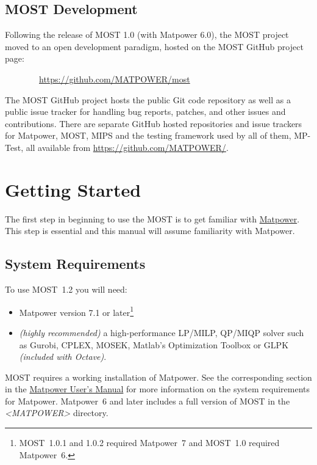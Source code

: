 \documentclass[12pt]{article}
\newcommand{\mpver}[0]{7.1}
\newcommand{\matlab}[0]{{\sc Matlab}}
\newcommand{\matpower}[0]{{\sc Matpower}}
\newcommand{\matpowerurl}[0]{https://matpower.org}
\newcommand{\matpowerlink}[0]{\href{\matpowerurl}{\matpower{}}}
\newcommand{\mptest}[0]{{MP-Test}}
\newcommand{\mips}[0]{{MIPS}}
\newcommand{\most}[0]{{MOST}}
\newcommand{\mosturl}[0]{https://github.com/MATPOWER/most}
\newcommand{\mostver}[0]{1.2}
\newcommand{\cplex}[0]{{CPLEX}}
\newcommand{\glpk}[0]{{GLPK}}
\newcommand{\gurobi}[0]{{Gurobi}}
\newcommand{\mosek}[0]{{MOSEK}}
\newcommand{\ot}[0]{{Optimization Toolbox}}
\newcommand{\code}[1]{{\relsize{-0.5}{\tt{{#1}}}}}  %
\newcommand{\mppath}[1]{\textsf{\textsl{{\relsize{-1.0}\textless{}\mbox{MATPOWER}\textgreater{}}}}\code{{#1}}}  %
\newcommand{\mostpath}[1]{\mppath{}\code{/most{#1}}}
\newcommand{\mumurl}[0]{https://matpower.org/docs/MATPOWER-manual-\mpver.pdf}
\newcommand{\mum}[0]{\href{\mumurl}{\matpower{} User's Manual}}
\numberwithin{equation}{section}
\numberwithin{table}{section}
\numberwithin{figure}{section}
\begin{document}
\subsection{\most{} Development}
\label{sec:development}

Following the release of \most{} 1.0 (with \matpower{} 6.0), the \most{} project moved to an open development paradigm, hosted on the \most{} GitHub project page:

\bigskip

~~~~~~~~\url{\mosturl}

\bigskip

The \most{} GitHub project hosts the public Git code repository as well as a public issue tracker for handling bug reports, patches, and other issues and contributions. There are separate GitHub hosted repositories and issue trackers for \matpower{}, \most{}, \mips{} and the testing framework used by all of them, \mptest{}, all available from \url{https://github.com/MATPOWER/}.


\clearpage
\section{Getting Started}

The first step in beginning to use the \most{} is to get familiar with \matpowerlink{}. This step is essential and this manual will assume familiarity with \matpower{}.

\subsection{System Requirements}
\label{sec:sysreq}
To use \most{}~\mostver{} you will need:
\begin{itemize}
\item \matpower{} version 7.1 or later\footnote{\most{}~1.0.1 and 1.0.2 required \matpower{}~7 and \most{}~1.0 required \matpower{}~6.}
\item \emph{(highly recommended)} a high-performance LP/MILP, QP/MIQP solver such as \gurobi{}, \cplex{}, \mosek{}, \matlab{}'s \ot{} or \glpk{} \emph{(included with Octave)}.
\end{itemize}

\most{} requires a working installation of \matpower{}. See the corresponding section in the \mum{} for more information on the system requirements for \matpower{}.
\matpower{}~6 and later includes a full version of \most{} in the \mostpath{} directory.
\end{document}
